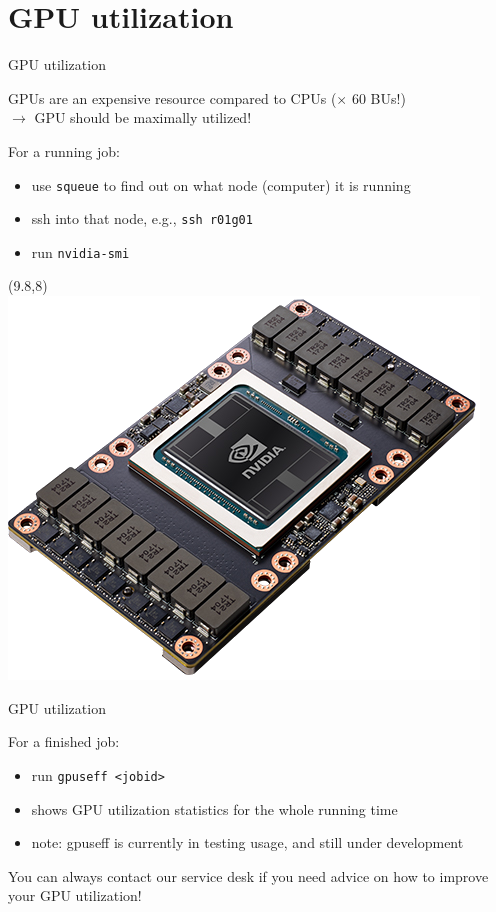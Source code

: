 \documentclass[aspectratio=1610,14pt]{beamer}
\newcommand{\vitem}{\vfill\item}
\begin{document}
\section{GPU utilization}

\begin{frame}{GPU utilization}

GPUs are an expensive resource compared to CPUs ($\times$ 60 BUs!) \\
$\rightarrow$ GPU should be maximally utilized!

\vspace{1em}

\begin{minipage}{0.8\textwidth}
For a running job:
\begin{itemize}
\item use {\tt squeue} to find out on what node (computer) it is running
\item ssh into that node, e.g., {\tt ssh r01g01}
\item run {\tt nvidia-smi}
\end{itemize}
\end{minipage}

\begin{textblock}{6}(9.8,8)
  \includegraphics[width=\textwidth]{v100}
\end{textblock}
\end{frame}

\begin{frame}{GPU utilization}

  For a finished job:

  \begin{itemize}
  \vitem run {\tt gpuseff <jobid>}
  \vitem shows GPU utilization statistics for the whole running time
  \vitem \alert{note:} gpuseff is currently in testing usage, and still
    under development
  \end{itemize}

  \vfill
  
  You can always contact our service desk if you need advice on how to
  improve your GPU utilization!
\end{frame}
\end{document}
